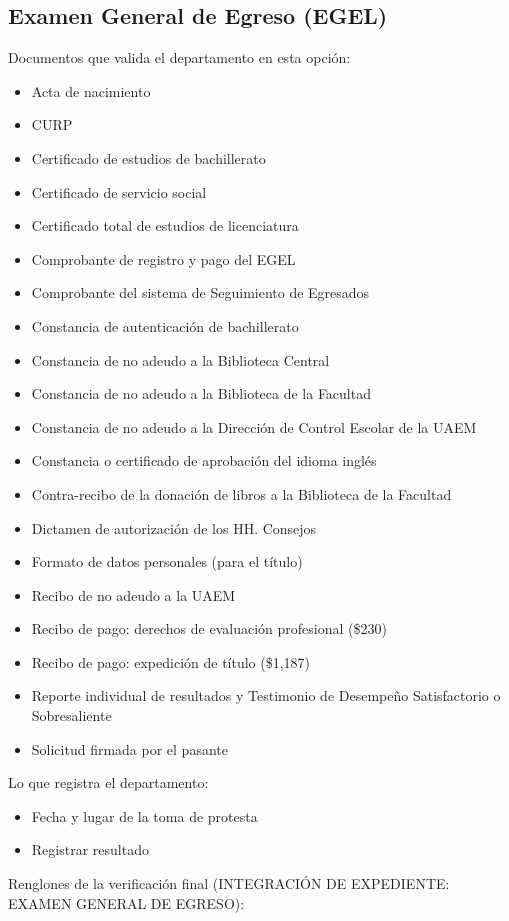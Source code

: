 \subsection{Examen General de Egreso (EGEL)}
Documentos que valida el departamento en esta opción:
\begin{itemize}
  \item Acta de nacimiento
  \item CURP
  \item Certificado de estudios de bachillerato
  \item Certificado de servicio social
  \item Certificado total de estudios de licenciatura
  \item Comprobante de registro y pago del EGEL
  \item Comprobante del sistema de Seguimiento de Egresados
  \item Constancia de autenticación de bachillerato
  \item Constancia de no adeudo a la Biblioteca Central
  \item Constancia de no adeudo a la Biblioteca de la Facultad
  \item Constancia de no adeudo a la Dirección de Control Escolar de la UAEM
  \item Constancia o certificado de aprobación del idioma inglés
  \item Contra-recibo de la donación de libros a la Biblioteca de la Facultad
  \item Dictamen de autorización de los HH. Consejos
  \item Formato de datos personales (para el título)
  \item Recibo de no adeudo a la UAEM
  \item Recibo de pago: derechos de evaluación profesional (\$230)
  \item Recibo de pago: expedición de título (\$1,187)
  \item Reporte individual de resultados y Testimonio de Desempeño Satisfactorio o Sobresaliente
  \item Solicitud firmada por el pasante
\end{itemize}
Lo que registra el departamento:
\begin{itemize}
  \item Fecha y lugar de la toma de protesta
  \item Registrar resultado
\end{itemize}
Renglones de la verificación final (INTEGRACIÓN DE EXPEDIENTE: EXAMEN GENERAL DE EGRESO):
